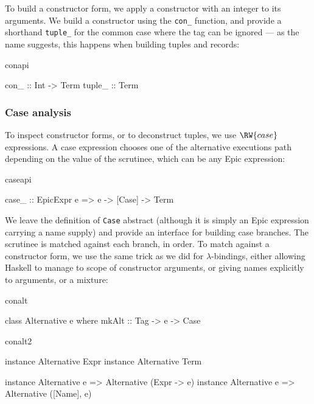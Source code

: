 
\noindent
To build a constructor form, we apply a constructor with an integer
 to its arguments. We build a constructor using the
\texttt{con\_} function, and provide a shorthand \texttt{tuple\_} for
the common case where the tag can be ignored --- as the name suggests,
this happens when building tuples and records:

\begin{SaveVerbatim}{conapi}

con_   :: Int -> Term
tuple_ :: Term

\end{SaveVerbatim}

\subsubsection*{Case analysis}

\noindent
To inspect constructor forms, or to deconstruct tuples, we use
$\RW{case}$ expressions. A case expression chooses one of the
alternative executions path depending on the value of the scrutinee,
which can be any Epic expression:

\begin{SaveVerbatim}{caseapi}

case_ :: EpicExpr e => e -> [Case] -> Term

\end{SaveVerbatim}

\noindent
We leave the definition of \texttt{Case} abstract (although it is
simply an Epic expression carrying a name supply) and provide an
interface for building case branches.
The scrutinee is matched against each branch, in order. To match
against a constructor form, we use the same trick as we did for
$\lambda$-bindings, either allowing Haskell to manage to scope of
constructor arguments, or giving names explicitly to arguments, or a
mixture:

\begin{SaveVerbatim}{conalt}

class Alternative e where
    mkAlt :: Tag -> e -> Case

\end{SaveVerbatim}
\begin{SaveVerbatim}{conalt2}

instance Alternative Expr
instance Alternative Term

instance Alternative e => Alternative (Expr -> e)
instance Alternative e => Alternative ([Name], e)

\end{SaveVerbatim}

